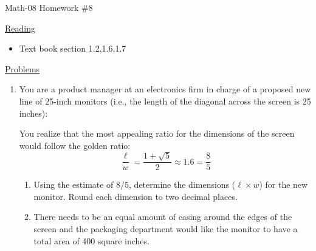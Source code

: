 \documentclass[letterpaper,12pt,fleqn]{article}
\begin{document}
\begin{center}
\Large Math-08 Homework \#8
\end{center}

\vspace{0.5in}

\underline{Reading}

\begin{itemize}
\item Text book section 1.2,1.6,1.7
\end{itemize}

\underline{Problems}

\begin{enumerate}

\item You are a product manager at an electronics firm in charge of a proposed
  new line of 25-inch monitors (i.e., the length of the diagonal across the
  screen is 25 inches):

  \bigskip

  \begin{figure}[h]
    \setlength{\leftskip}{1in}
  \end{figure}

  You realize that the most appealing ratio for the dimensions of the screen
  would follow the golden ratio:
  \[\frac{\ell}{w}=\frac{1+\sqrt{5}}{2}\approx1.6=\frac{8}{5}\]

  \begin{enumerate}
  \item Using the estimate of $8/5$, determine the dimensions ($\ell\times w$)
    for the new monitor. Round each dimension to two decimal places.

  \item There needs to be an equal amount of casing around the edges of the
    screen and the packaging department would like the monitor to have a total
    area of 400 square inches.

    \begin{figure}[h]
      \setlength{\leftskip}{1in}
    \end{figure}


\end{enumerate}
\end{enumerate}
\end{document}
